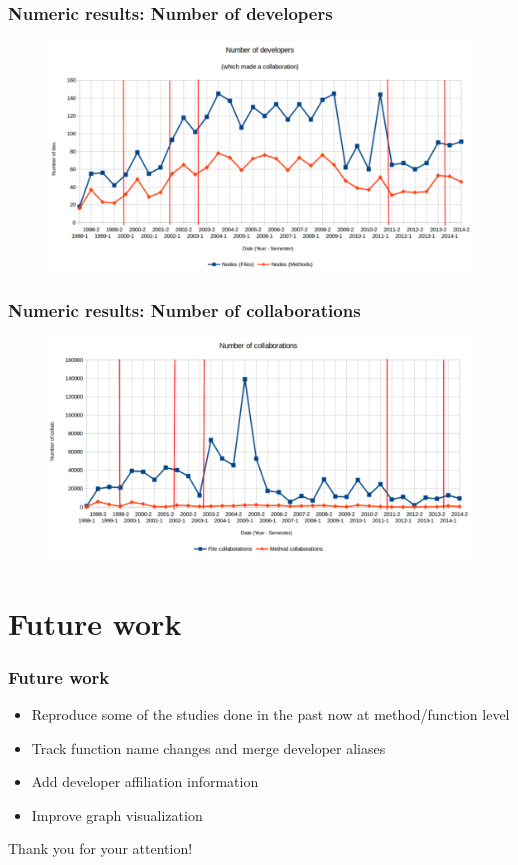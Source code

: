 \documentclass{beamer}
\begin{document}
\begin{frame}
\frametitle{Numeric results: Number of developers}
\begin{figure}
\includegraphics[scale=0.32]{chart1.png}
\label{fig:chartdev1}
\end{figure}
\end{frame}

\begin{frame}
\frametitle{Numeric results: Number of collaborations}
\begin{figure}
\includegraphics[scale=0.32]{chart2.png}
\label{fig:chartdev2}
\end{figure}
\end{frame}

\section{Future work}

\begin{frame}
\frametitle{Future work}
\begin{itemize}
\item Reproduce some of the studies done in the past now at method/function level
\item Track function name changes and merge developer aliases
\item Add developer affiliation information
\item Improve graph visualization
\end{itemize}
\end{frame}


\begin{frame}
\Huge{\centerline{Thank you for your attention!}}
\end{frame}

\end{document}
